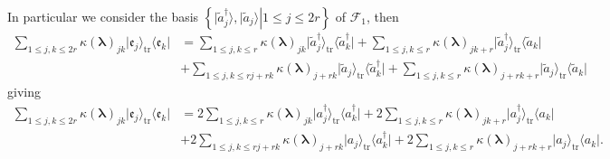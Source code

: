 \documentclass[aps, preprint]{revtex4}
\begin{document}
In particular we consider the basis $\left \{\left .\vert \widetilde{a}_{j}^{ \dag } \rangle  ,\vert \widetilde{a}_{j} \rangle \right \vert 1 \leq j \leq 2 r\right \}$ of $\mathcal{F}_{1}$, then
\begin{align}\sum _{1 \leq j ,k \leq 2 r}\kappa  \left (\mathbf{\lambda }\right )_{j k} \vert \mathfrak{e}_{j} \rangle _{\ensuremath{\operatorname*{tr}}} \langle \mathfrak{e}_{k}\vert  &  =\sum _{1 \leq j ,k \leq r}\kappa  \left (\mathbf{\lambda }\right )_{j k} \vert \widetilde{a}_{j}^{ \dag } \rangle _{\ensuremath{\operatorname*{tr}}}  \langle \widetilde{a}_{k}^{ \dag }\vert  +\sum _{1 \leq j ,k \leq r}\kappa  \left (\mathbf{\lambda }\right )_{j k +r} \vert \widetilde{a}_{j}^{ \dag } \rangle _{\ensuremath{\operatorname*{tr}}} \langle \widetilde{a}_{k}\vert  \\
 &  +\sum _{1 \leq j ,k \leq r j +r k}\kappa  \left (\mathbf{\lambda }\right )_{j +r k} \vert \widetilde{a}_{j} \rangle _{\ensuremath{\operatorname*{tr}}}  \langle \widetilde{a}_{k}^{ \dag }\vert  +\sum _{1 \leq j ,k \leq r}\kappa  \left (\mathbf{\lambda }\right )_{j +r k +r} \vert \widetilde{a}_{j} \rangle _{\ensuremath{\operatorname*{tr}}} \langle \widetilde{a}_{k}\vert \end{align}giving
\begin{align}\sum _{1 \leq j ,k \leq 2 r}\kappa  \left (\mathbf{\lambda }\right )_{j k} \vert \mathfrak{e}_{j} \rangle _{\ensuremath{\operatorname*{tr}}} \langle \mathfrak{e}_{k}\vert  &  =2 \sum _{1 \leq j ,k \leq r}\kappa  \left (\mathbf{\lambda }\right )_{j k} \vert a_{j}^{ \dag } \rangle _{\ensuremath{\operatorname*{tr}}}  \langle a_{k}^{ \dag }\vert  +2 \sum _{1 \leq j ,k \leq r}\kappa  \left (\mathbf{\lambda }\right )_{j k +r} \vert a_{j}^{ \dag } \rangle _{\ensuremath{\operatorname*{tr}}} \langle a_{k}\vert  \\
 &  +2 \sum _{1 \leq j ,k \leq r j +r k}\kappa  \left (\mathbf{\lambda }\right )_{j +r k} \vert a_{j} \rangle _{\ensuremath{\operatorname*{tr}}}  \langle a_{k}^{ \dag }\vert  +2 \sum _{1 \leq j ,k \leq r}\kappa  \left (\mathbf{\lambda }\right )_{j +r k +r} \vert a_{j} \rangle _{\ensuremath{\operatorname*{tr}}} \langle a_{k}\vert \text{.}\end{align}
\end{document}
